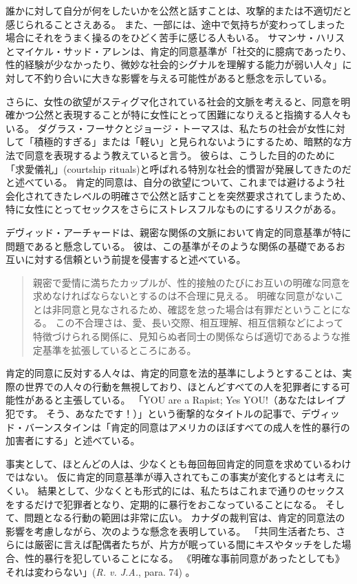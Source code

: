 \documentclass[paper=a4,book,openany]{jlreq}
\newcommand{\ig}[1]{}           %
\begin{document}
誰かに対して自分が何をしたいかを公然と話すことは、攻撃的または不適切だと感じられることさえある。
また、一部には、途中で気持ちが変わってしまった場合にそれをうまく操るのをひどく苦手に感じる人もいる。
サマンサ・ハリス\ig{Samantha Harris}とマイケル・サッド・アレン\ig{Michael Thad Allen}は、肯定的同意基準が「社交的に臆病であったり、性的経験が少なかったり、微妙な社会的シグナルを理解する能力が弱い人々」に対して不釣り合いに大きな影響を与える可能性があると懸念を示している\citep{harris20:_bad_vibrat}。

さらに、女性の欲望がスティグマ化されている社会的文脈を考えると、同意を明確かつ公然と表現することが特に女性にとって困難になりえると指摘する人々もいる。
ダグラス・フーサク\ig{Douglas Husak}とジョージ・トーマス\ig{George C. Thomas}は、私たちの社会が女性に対して「積極的すぎる」または「軽い」と見られないようにするため、暗黙的な方法で同意を表現するよう教えていると言う。
彼らは、こうした目的のために「求愛儀礼」(courtship rituals)と呼ばれる特別な社会的慣習が発展してきたのだと述べている。
肯定的同意は、自分の欲望について、これまでは避けるよう社会化されてきたレベルの明確さで公然と話すことを突然要求されてしまうため、特に女性にとってセックスをさらにストレスフルなものにするリスクがある\citep{husak92:_date}。

デヴィッド・アーチャードは、親密な関係の文脈において肯定的同意基準が特に問題であると懸念している。
彼は、この基準がそのような関係の基礎であるお互いに対する信頼という前提を侵害すると述べている。

\begin{quote}
親密で愛情に満ちたカップルが、性的接触のたびにお互いの明確な同意を求めなければならないとするのは不合理に見える。
明確な同意がないことは非同意と見なされるため、確認を怠った場合は有罪だということになる。
この不合理さは、愛、長い交際、相互理解、相互信頼などによって特徴づけられる関係に、見知らぬ者同士の関係ならば適切であるような推定基準を拡張しているところにある。
\citep[p.146]{archard98:_sexual_consen}
\end{quote}

肯定的同意に反対する人々は、肯定的同意を法的基準にしようとすることは、実際の世界での人々の行動を無視しており、ほとんどすべての人を犯罪者にする可能性があると主張している。
「YOU are a Rapist; Yes YOU!（あなたはレイプ犯です。
そう、あなたです！）」という衝撃的なタイトルの記事で、デヴィッド・バーンスタイン\ig{David Bernstein}は「肯定的同意はアメリカのほぼすべての成人を性的暴行の加害者にする」と述べている\citep{bernstein14:_you_are_rapis}。
\ig{David Bernstein}
事実として、ほとんどの人は、少なくとも毎回毎回肯定的同意を求めているわけではない。
仮に肯定的同意基準が導入されてもこの事実が変化するとは考えにくい。
結果として、少なくとも形式的には、私たちはこれまで通りのセックスをするだけで犯罪者となり、定期的に暴行をおこなっていることになる。
そして、問題となる行動の範囲は非常に広い。
カナダの裁判官は、肯定的同意法の影響を考慮しながら、次のような懸念を表明している。
「共同生活者たち、さらには厳密に言えば配偶者たちが、片方が眠っている間にキスやタッチをした場合、性的暴行を犯していることになる。
《明確な事前同意があったとしても》それは変わらない」(\emph{R. v. J.A.}, \ig{2011 SCC 28,} para. 74\ig{\footnote{\url{https://scc-csc.lexum.com/scc-csc/scc-csc/en/item/7942/index.do}.}}) 。
\end{document}
